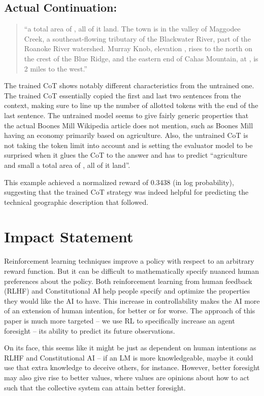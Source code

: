 \documentclass{article}
\begin{document}
\subsection{Actual Continuation:}
\begin{quote}
``a total area of , all of it land. The town is in the valley of Maggodee Creek, a southeast-flowing tributary of the Blackwater River, part of the Roanoke River watershed. Murray Knob, elevation , rises  to the north on the crest of the Blue Ridge, and the eastern end of Cahas Mountain, at , is 2 miles to the west.''
\end{quote}

The trained CoT shows notably different characteristics from the untrained one. The trained CoT essentially copied the first and last two sentences from the context, making sure to line up the number of allotted tokens with the end of the last sentence. The untrained model seems to give fairly generic properties that the actual Boones Mill Wikipedia article does not mention, such as Boones Mill having an economy primarily based on agriculture. Also, the untrained CoT is not taking the token limit into account and is setting the evaluator model to be surprised when it glues the CoT to the answer and has to predict ``agriculture and small a total area of , all of it land''.

This example achieved a normalized reward of 0.3438 (in log probability), suggesting that the trained CoT strategy was indeed helpful for predicting the technical geographic description that followed.


\section{Impact Statement}
\label{sec:ethics}
Reinforcement learning techniques improve a policy with respect to an arbitrary reward function. But it can be difficult to mathematically specify nuanced human preferences about the policy. Both reinforcement learning from human feedback (RLHF) \citep{christiano2023deepreinforcementlearninghuman} and Constitutional AI \citep{bai2022constitutional} help people specify and optimize the properties they would like the AI to have. This increase in controllability makes the AI more of an extension of human intention, for better or for worse. The approach of this paper is much more targeted -- we use RL to specifically increase an agent foresight -- its ability to predict its future observations. 

On its face, this seems like it might be just as dependent on human intentions as RLHF and Constitutional AI -- if an LM is more knowledgeable, maybe it could use that extra knowledge to deceive others, for instance. However, better foresight may also give rise to better values, where values are opinions about how to act such that the collective system can attain better foresight.
\end{document}
